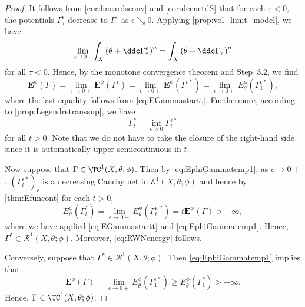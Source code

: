 \begin{proof}
    It follows from \cref{cor:lineardsconv} and \cref{cor:decnetdS} that for each $\tau<0$, the potentials $\Gamma^{\epsilon}_{\tau}$ decrease to $\Gamma_{\tau}$ as $\epsilon\searrow 0$. Applying \cref{prop:vol_limit_model}, we have
    \[
    \lim_{\epsilon \to 0+} \int_X \left(\theta+\ddc \Gamma^{\epsilon}_{\tau}\right)^n=\int_X \left(\theta+\ddc \Gamma_{\tau}\right)^n
    \]
    for all $\tau<0$. Hence, by the monotone convergence theorem and Step~3.2, we find
    \begin{equation}\label{eq:EphiGammatemp1}
        \mathbf{E}^{\phi}(\Gamma)=\lim_{\epsilon\to 0+}\mathbf{E}^{\phi}(\Gamma^{\epsilon})=\lim_{\epsilon\to 0+}\mathbf{E}^{\phi}(\Gamma^{\epsilon *})=\lim_{\epsilon\to 0+} E_{\theta}^{\phi}(\Gamma^{\epsilon *}_1),
    \end{equation}
    where the last equality follows from \eqref{eq:EGammastartt}.
    Furthermore, according to \cref{prop:Legendretranssup}, we have
    \[
    \Gamma^*_t=\inf_{\epsilon>0} \Gamma^{\epsilon *}_t
    \]
    for all $t>0$. Note that we do not have to take the closure of the right-hand side since it is automatically upper semicontinuous in $t$.

    Now suppose that $\Gamma\in \TC^1(X,\theta;\phi)$.
    Then by \eqref{eq:EphiGammatemp1}, as $\epsilon\to 0+$, $(\Gamma_t^{\epsilon *})_{\epsilon}$ is a decreasing Cauchy net in $\mathcal{E}^1(X,\theta;\phi)$ and hence by \cref{thm:Efuncont} for each $t>0$,
    \[
    E_{\theta}^{\phi}\left(\Gamma^*_t\right)=\lim_{\epsilon\to 0+}E_{\theta}^{\phi}\left(\Gamma^{\epsilon,*}_t\right)=t\mathbf{E}^{\phi}(\Gamma)>-\infty,
    \]
    where we have applied \eqref{eq:EGammastartt} and \eqref{eq:EphiGammatemp1}.
    Hence, $\Gamma^*\in \mathcal{R}^1(X,\theta;\phi)$. Moreover, \eqref{eq:RWNenergy} follows.

    Conversely, suppose that $\Gamma^*\in \mathcal{R}^1(X,\theta;\phi)$. Then \eqref{eq:EphiGammatemp1} implies that
    \[
    \mathbf{E}^{\phi}(\Gamma)=\lim_{\epsilon\to 0+} E_{\theta}^{\phi}\left(\Gamma^{\epsilon *}_1\right) \geq E_{\theta}^{\phi}\left(\Gamma^*_1\right)>-\infty.
    \]
    Hence, $\Gamma\in \TC^1(X,\theta;\phi)$.
\end{proof}

